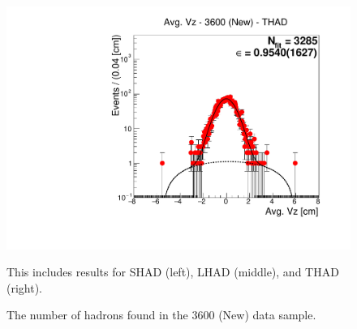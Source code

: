 \begin{figure}[H]
\includegraphics[scale=0.25]{figures/plots/nonDDbar_fit_results/3650_new/fit_new_3600_data_THAD.pdf}
\caption{The number of hadrons found in the 3600 (New) data sample.}
{This includes results for SHAD (left), LHAD (middle), and THAD (right).}
\label{fig:hadron_fits_3600_new}
\end{figure}


